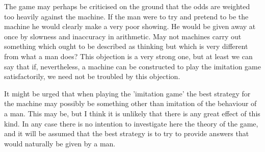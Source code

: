     The game may perhaps be criticised on the ground that the odds are weighted too heavily against the machine. If the man were to try and pretend to be the machine he would clearly make a very poor showing. He would be given away at once by slowness and inaccuracy in arithmetic. May not machines carry out something which ought to be described as thinking but which is very different from what a man does? This objection is a very strong one, but at least we can say that if, nevertheless, a machine can be constructed to play the imitation game satisfactorily, we need not be troubled by this objection.

    It might be urged that when playing the 'imitation game' the best strategy for the machine may possibly be something other than imitation of the behaviour of a man. This may be, but I think it is unlikely that there is any great effect of this kind. In any case there is no intention to investigate here the theory of the game, and it will be assumed that the best strategy is to try to provide answers that would naturally be given by a man.